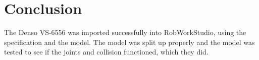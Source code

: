 \section{Conclusion}
\label{sec:conclusion}

The Denso VS-6556 was imported successfully into RobWorkStudio, using the specification and the model. The model was split up properly and the model was tested to see if the joints and collision functioned, which they did. 